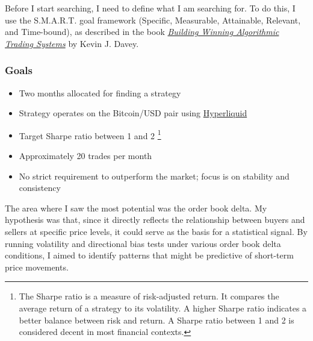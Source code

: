 \documentclass[12pt]{article}
\begin{document}
Before I start searching, I need to define what I am searching for. To do this, I use the S.M.A.R.T. goal framework (Specific, Measurable, Attainable, Relevant, and Time-bound), as described in the book \href{https://www.amazon.com/Building-Winning-Algorithmic-Trading-Systems/dp/1118778987}{\textit{Building Winning Algorithmic Trading Systems}} by Kevin J. Davey.

\subsubsection*{Goals}
\begin{itemize}
    \item Two months allocated for finding a strategy
    \item Strategy operates on the Bitcoin/USD pair using \href{https://hyperfoundation.org/}{Hyperliquid}
    \item Target Sharpe ratio between 1 and 2 \footnote{The Sharpe ratio is a measure of risk-adjusted return. It compares the average return of a strategy to its volatility. A higher Sharpe ratio indicates a better balance between risk and return. A Sharpe ratio between 1 and 2 is considered decent in most financial contexts.}
    \item Approximately 20 trades per month
    \item No strict requirement to outperform the market; focus is on stability and consistency
\end{itemize}



The area where I saw the most potential was the order book delta. My hypothesis was that, since it directly reflects the relationship between buyers and sellers at specific price levels, it could serve as the basis for a statistical signal. By running volatility and directional bias tests under various order book delta conditions, I aimed to identify patterns that might be predictive of short-term price movements.
\end{document}
